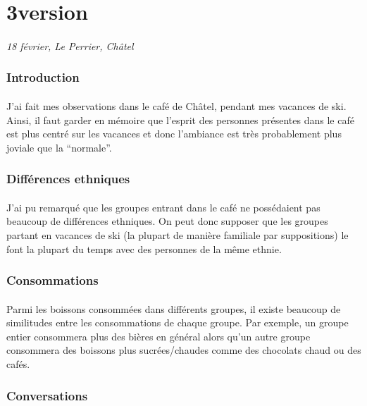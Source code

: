 \section{3\ieme version}

\paragraph{}
\emph{18 février, Le Perrier, Châtel}

\subsubsection{Introduction}
\paragraph{}
J'ai fait mes observations dans le café de Châtel, pendant mes vacances de ski.
Ainsi, il faut garder en mémoire que l'esprit des personnes présentes dans le
café est plus centré sur les vacances et donc l'ambiance est très probablement
plus joviale que la ``normale''.

\subsubsection{Différences ethniques}
\paragraph{}
J'ai pu remarqué que les groupes entrant dans le café ne possédaient pas
beaucoup de différences ethniques. On peut donc supposer que les groupes
partant en vacances de ski (la plupart de manière familiale par suppositions)
le font la plupart du temps avec des personnes de la même ethnie.

\subsubsection{Consommations}
\paragraph{}
Parmi les boissons consommées dans différents groupes, il existe beaucoup de
similitudes entre les consommations de chaque groupe. Par exemple, un groupe
entier consommera plus des bières en général alors qu'un autre groupe
consommera des boissons plus sucrées/chaudes comme des chocolats chaud ou des
cafés.

\subsubsection{Conversations}
